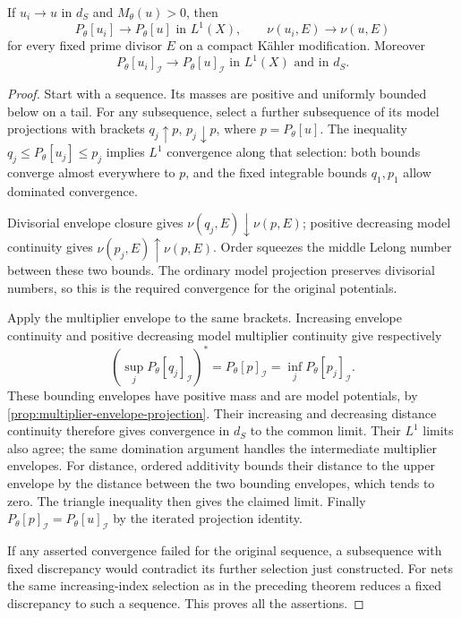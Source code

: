 \begin{proposition}\label{prop:singularity-projection-and-lelong-continuity}
If $u_i\to u$ in $d_S$ and $M_\theta(u)>0$, then
\[
 P_\theta[u_i]\longrightarrow P_\theta[u]\text{ in }L^1(X),
 \qquad
 \nu(u_i,E)\longrightarrow\nu(u,E)
\]
for every fixed prime divisor $E$ on a compact K\"ahler modification. Moreover
\[
 P_\theta[u_i]_{\mathcal I}\longrightarrow
 P_\theta[u]_{\mathcal I}\text{ in }L^1(X)\text{ and in }d_S.
\]
\end{proposition}
\begin{proof}
Start with a sequence. Its masses are positive and uniformly bounded below on a tail. For any subsequence, select a further subsequence of its model projections with brackets $q_j\uparrow p$, $p_j\downarrow p$, where $p=P_\theta[u]$. The inequality $q_j\leq P_\theta[u_j]\leq p_j$ implies $L^1$ convergence along that selection: both bounds converge almost everywhere to $p$, and the fixed integrable bounds $q_1,p_1$ allow dominated convergence.

Divisorial envelope closure gives $\nu(q_j,E)\downarrow\nu(p,E)$; positive decreasing model continuity gives $\nu(p_j,E)\uparrow\nu(p,E)$. Order squeezes the middle Lelong number between these two bounds. The ordinary model projection preserves divisorial numbers, so this is the required convergence for the original potentials.

Apply the multiplier envelope to the same brackets. Increasing envelope continuity and positive decreasing model multiplier continuity give respectively
\[
 (\sup_jP_\theta[q_j]_{\mathcal I})^*
     =P_\theta[p]_{\mathcal I}
     =\inf_jP_\theta[p_j]_{\mathcal I}.
\]
These bounding envelopes have positive mass and are model potentials, by \cref{prop:multiplier-envelope-projection}. Their increasing and decreasing distance continuity therefore gives convergence in $d_S$ to the common limit. Their $L^1$ limits also agree; the same domination argument handles the intermediate multiplier envelopes. For distance, ordered additivity bounds their distance to the upper envelope by the distance between the two bounding envelopes, which tends to zero. The triangle inequality then gives the claimed limit. Finally $P_\theta[p]_{\mathcal I}=P_\theta[u]_{\mathcal I}$ by the iterated projection identity.

If any asserted convergence failed for the original sequence, a subsequence with fixed discrepancy would contradict its further selection just constructed. For nets the same increasing-index selection as in the preceding theorem reduces a fixed discrepancy to such a sequence. This proves all the assertions.
\end{proof}

